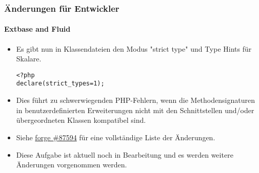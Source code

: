 \begin{frame}[fragile]
	\frametitle{Änderungen für Entwickler}
	\framesubtitle{Extbase and Fluid}

	\lstset{basicstyle=\smaller\ttfamily}

	\begin{itemize}
		\item Es gibt nun in Klassendateien den Modus "strict type" und Type Hints für Skalare.

\begin{lstlisting}
<?php
declare(strict_types=1);
\end{lstlisting}

		\item Dies führt zu schwerwiegenden PHP-Fehlern, wenn die Methodensignaturen in benutzerdefinierten
			  Erweiterungen nicht mit den Schnittstellen und/oder übergeordneten Klassen kompatibel sind.

		\item Siehe \href{https://forge.typo3.org/issues/87594}{forge \#87594}
			für eine vollständige Liste der Änderungen.

		\item Diese Aufgabe ist aktuell noch in Bearbeitung und es werden weitere Änderungen vorgenommen werden.

	\end{itemize}

\end{frame}


